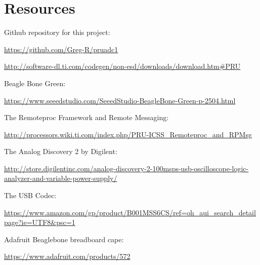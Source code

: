 %
%
%

\chapter{Resources}


Github repository for this project:

\url{https://github.com/Greg-R/pruadc1}

\url{http://software-dl.ti.com/codegen/non-esd/downloads/download.htm#PRU}

Beagle Bone Green:

\url{https://www.seeedstudio.com/SeeedStudio-BeagleBone-Green-p-2504.html}

The Remoteproc Framework and Remote Messaging:

\url{http://processors.wiki.ti.com/index.php/PRU-ICSS_Remoteproc_and_RPMsg}

The Analog Discovery 2 by Digilent:

\url{http://store.digilentinc.com/analog-discovery-2-100msps-usb-oscilloscope-logic-analyzer-and-variable-power-supply/}

The USB Codec:

\url{https://www.amazon.com/gp/product/B001MSS6CS/ref=oh_aui_search_detailpage?ie=UTF8&psc=1}

Adafruit Beaglebone breadboard cape:

\url{https://www.adafruit.com/products/572}
